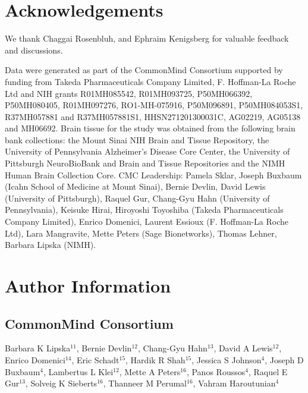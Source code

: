 \documentclass[letterpaper]{article}
\begin{document}
\section*{Acknowledgements}

We thank Chaggai Rosenbluh, and Ephraim Kenigsberg for valuable feedback and discussions.

Data were generated as part of the CommonMind Consortium supported by funding
from Takeda Pharmaceuticals Company Limited, F. Hoffman-La Roche Ltd and NIH
grants R01MH085542, R01MH093725, P50MH066392, P50MH080405, R01MH097276,
RO1-MH-075916, P50M096891, P50MH084053S1, R37MH057881 and R37MH057881S1,
HHSN271201300031C, AG02219, AG05138 and MH06692. Brain tissue for the study
was obtained from the following brain bank collections: the Mount Sinai NIH
Brain and Tissue Repository, the University of Pennsylvania Alzheimer’s
Disease Core Center, the University of Pittsburgh NeuroBioBank and Brain and
Tissue Repositories and the NIMH Human Brain Collection Core. CMC Leadership:
Pamela Sklar, Joseph Buxbaum (Icahn School of Medicine at Mount Sinai), Bernie
Devlin, David Lewis (University of Pittsburgh), Raquel Gur, Chang-Gyu Hahn
(University of Pennsylvania), Keisuke Hirai, Hiroyoshi Toyoshiba (Takeda
Pharmaceuticals Company Limited), Enrico Domenici, Laurent Essioux (F.
Hoffman-La Roche Ltd), Lara Mangravite, Mette Peters (Sage Bionetworks),
Thomas Lehner, Barbara Lipska (NIMH).

\section*{Author Information}

\subsection*{CommonMind Consortium}

Barbara K Lipska\(^{11}\), Bernie Devlin\(^{12}\), Chang-Gyu Hahn\(^{13}\), David A Lewis\(^{12}\), Enrico
Domenici\(^{14}\), Eric Schadt\(^{15}\), Hardik R Shah\(^{15}\), Jessica S
Johnson\(^{4}\), Joseph D Buxbaum\(^{4}\),
Lambertus L Klei\(^{12}\), Mette A Peters\(^{16}\), Panos Roussos\(^{4}\),
Raquel E Gur\(^{13}\), Solveig K
Sieberts\(^{16}\), Thanneer M Perumal\(^{16}\), Vahram Haroutunian\(^{4}\)
\end{document}
